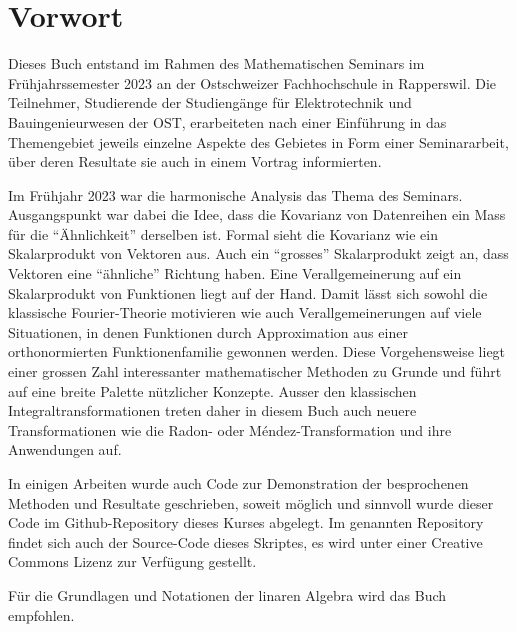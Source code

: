 %
%
%
\chapter*{Vorwort}

Dieses Buch entstand im Rahmen des Mathematischen Seminars
im Frühjahrssemester 2023 an der Ostschweizer Fachhochschule in Rapperswil.
Die Teilnehmer, Studierende der Studiengänge für Elektrotechnik
und Bauingenieurwesen
der OST, erarbeiteten nach einer Einführung in das Themengebiet jeweils
einzelne Aspekte des Gebietes in Form einer Seminararbeit, über
deren Resultate sie auch in einem Vortrag informierten. 

Im Frühjahr 2023 war die harmonische Analysis das Thema des Seminars.
Ausgangspunkt war dabei die Idee, dass die Kovarianz von Datenreihen
ein Mass für die ``Ähnlichkeit'' derselben ist.
Formal sieht die Kovarianz wie ein Skalarprodukt von Vektoren aus.
Auch ein ``grosses'' Skalarprodukt zeigt an, dass Vektoren eine
``ähnliche'' Richtung haben.
Eine Verallgemeinerung auf ein Skalarprodukt von Funktionen liegt auf der Hand.
Damit lässt sich sowohl die klassische Fourier-Theorie motivieren
wie auch Verallgemeinerungen auf viele Situationen, in denen Funktionen
durch Approximation aus einer orthonormierten Funktionenfamilie gewonnen
werden.
Diese Vorgehensweise liegt einer grossen Zahl interessanter mathematischer
Methoden zu Grunde und führt auf eine breite Palette nützlicher
Konzepte.
Ausser den klassischen Integraltransformationen treten daher in diesem
Buch auch neuere Transformationen wie die Radon- oder M\'endez-Transformation
und ihre Anwendungen auf.

In einigen Arbeiten wurde auch Code zur Demonstration der 
besprochenen Methoden und Resultate geschrieben, soweit
möglich und sinnvoll wurde dieser Code im Github-Repository
%
dieses Kurses
\cite{buch:repo}
abgelegt.
Im genannten Repository findet sich auch der Source-Code dieses
Skriptes, es wird unter einer Creative Commons Lizenz
zur Verfügung gestellt.

Für die Grundlagen und Notationen der linaren Algebra wird das
Buch \cite{buch:linalg} empfohlen.


